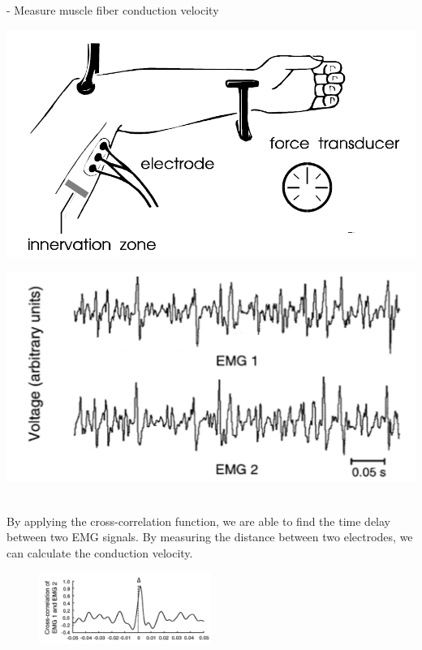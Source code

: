 \begin{ex}{- Measure muscle fiber conduction velocity}
    \begin{minipage}{0.4\textwidth}
    \includegraphics[width=\textwidth]{images/emg3}
    \end{minipage}\hfill
    \begin{minipage}{0.4\textwidth}
    \includegraphics[width=\textwidth]{images/emg1}
    \end{minipage}
    \ \\
    By applying the cross-correlation function, we are able to find the time delay between two EMG signals. By measuring the distance between two electrodes, we can calculate the conduction velocity.
    \begin{figure}[H] 
        \centering
        \includegraphics[width=0.5\textwidth]{images/emg2}
    \end{figure}
\end{ex}
 
